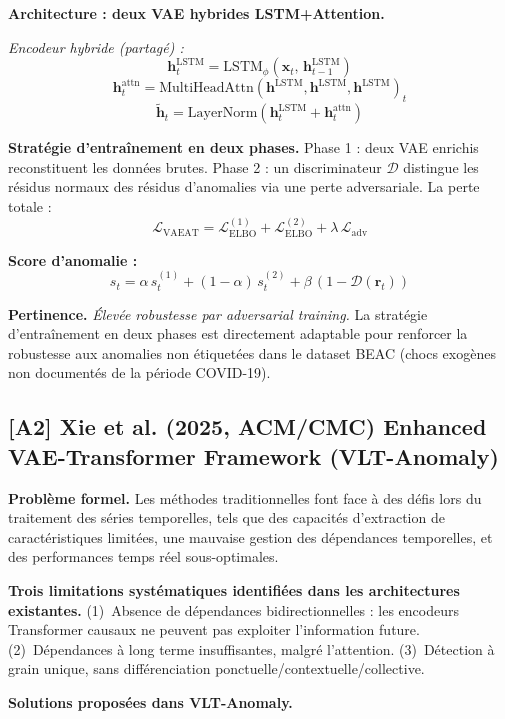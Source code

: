 \documentclass[12pt,a4paper]{article}
\begin{document}
\textbf{Architecture : deux VAE hybrides LSTM+Attention.}

\textit{Encodeur hybride (partagé) :}
$$\mathbf{h}^{\mathrm{LSTM}}_t = \mathrm{LSTM}_\phi(\mathbf{x}_t,\,\mathbf{h}^{\mathrm{LSTM}}_{t-1})$$
$$\mathbf{h}^{\mathrm{attn}}_t = \mathrm{MultiHeadAttn}(\mathbf{h}^{\mathrm{LSTM}},\mathbf{h}^{\mathrm{LSTM}},\mathbf{h}^{\mathrm{LSTM}})_t$$
$$\tilde{\mathbf{h}}_t = \mathrm{LayerNorm}(\mathbf{h}^{\mathrm{LSTM}}_t + \mathbf{h}^{\mathrm{attn}}_t)$$

\textbf{Stratégie d'entraînement en deux phases.} Phase 1 : deux VAE enrichis reconstituent les données brutes. Phase 2 : un discriminateur $\mathcal{D}$ distingue les résidus normaux des résidus d'anomalies via une perte adversariale. La perte totale :
$$\mathcal{L}_{\mathrm{VAEAT}} = \mathcal{L}^{(1)}_{\mathrm{ELBO}} + \mathcal{L}^{(2)}_{\mathrm{ELBO}} + \lambda\,\mathcal{L}_{\mathrm{adv}}$$

\textbf{Score d'anomalie :}
$$s_t = \alpha\,s^{(1)}_t + (1-\alpha)\,s^{(2)}_t + \beta\,(1-\mathcal{D}(\mathbf{r}_t))$$

\textbf{Pertinence.} \textit{Élevée  robustesse par adversarial training.} La stratégie d'entraînement en deux phases est directement adaptable pour renforcer la robustesse aux anomalies non étiquetées dans le dataset BEAC (chocs exogènes non documentés de la période COVID-19).

\subsection{[A2] Xie et al. (2025, ACM/CMC)  Enhanced VAE-Transformer Framework (VLT-Anomaly)}

\textbf{Problème formel.} Les méthodes traditionnelles font face à des défis lors du traitement des séries temporelles, tels que des capacités d'extraction de caractéristiques limitées, une mauvaise gestion des dépendances temporelles, et des performances temps réel sous-optimales.

\textbf{Trois limitations systématiques identifiées dans les architectures existantes.} (1)~Absence de dépendances bidirectionnelles : les encodeurs Transformer causaux ne peuvent pas exploiter l'information future. (2)~Dépendances à long terme insuffisantes, malgré l'attention. (3)~Détection à grain unique, sans différenciation ponctuelle/contextuelle/collective.

\textbf{Solutions proposées dans VLT-Anomaly.}
\end{document}
